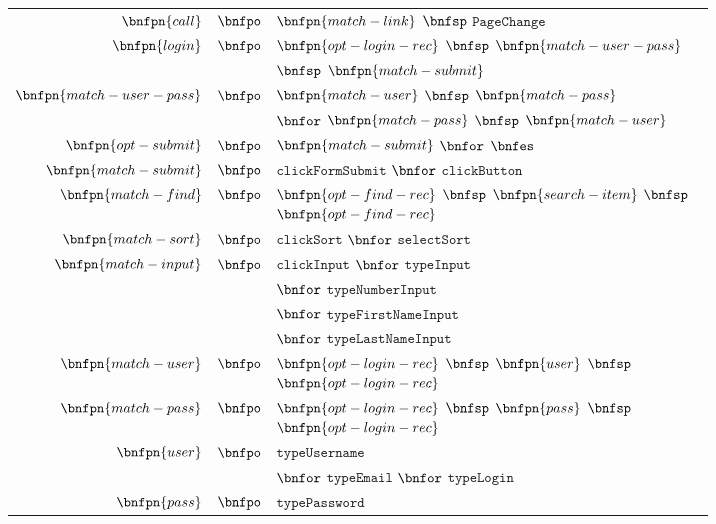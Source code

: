 \documentclass[conference]{IEEEtran}
\begin{document}
\begin{enumerate}
\begin{figure}[!htb]
\begin{itemize}
\begin{figure}[!htb]
\begin{itemize}
\begin{table}[!htb]
\begin{tabular}{rcl}
  $\bnfpn{call}$ & $\bnfpo$ &  $\bnfpn{match-link}$ $\bnfsp$ $\texttt{PageChange}$ \\
  
  $\bnfpn{login}$ & $\bnfpo$ &  $\bnfpn{opt-login-rec}$ $\bnfsp$ $\bnfpn{match-user-pass}$\\
  & & $\bnfsp$ $\bnfpn{match-submit}$ \\
  
  $\bnfpn{match-user-pass}$ & $\bnfpo$ &  $\bnfpn{match-user}$ $\bnfsp$ $\bnfpn{match-pass}$ \\
  & & $\bnfor$ $\bnfpn{match-pass}$ $\bnfsp$ $\bnfpn{match-user}$ \\
  
  $\bnfpn{opt-submit}$ & $\bnfpo$ &  $\bnfpn{match-submit}$ $\bnfor$ $\bnfes$ \\
  
  $\bnfpn{match-submit}$ & $\bnfpo$ &  $\texttt{clickFormSubmit}$ $\bnfor$ $\texttt{clickButton}$ \\
  
  $\bnfpn{match-find}$ & $\bnfpo$ &  $\bnfpn{opt-find-rec}$ $\bnfsp$ $\bnfpn{search-item}$ $\bnfsp$ $\bnfpn{opt-find-rec}$ \\
  
  $\bnfpn{match-sort}$ & $\bnfpo$ &  $\texttt{clickSort}$ $\bnfor$ $\texttt{selectSort}$ \\
  
  $\bnfpn{match-input}$ & $\bnfpo$ &  $\texttt{clickInput}$ $\bnfor$ $\texttt{typeInput}$ \\
  & & $\bnfor$ $\texttt{typeNumberInput}$ \\ 
  & & $\bnfor$ $\texttt{typeFirstNameInput}$ \\
  & & $\bnfor$ $\texttt{typeLastNameInput}$ \\
  
  $\bnfpn{match-user}$ & $\bnfpo$ &  $\bnfpn{opt-login-rec}$ $\bnfsp$ $\bnfpn{user}$ $\bnfsp$ $\bnfpn{opt-login-rec}$ \\
  
  $\bnfpn{match-pass}$ & $\bnfpo$ &  $\bnfpn{opt-login-rec}$ $\bnfsp$ $\bnfpn{pass}$ $\bnfsp$ $\bnfpn{opt-login-rec}$ \\
  
  $\bnfpn{user}$ & $\bnfpo$ &  $\texttt{typeUsername}$ \\
  & & $\bnfor$ $\texttt{typeEmail}$ $\bnfor$ $\texttt{typeLogin}$ \\
  
  $\bnfpn{pass}$ & $\bnfpo$ &  $\texttt{typePassword}$ \\
  

\end{tabular}
\end{table}
\end{itemize}
\end{figure}
\end{itemize}
\end{figure}
\end{enumerate}
\end{document}
